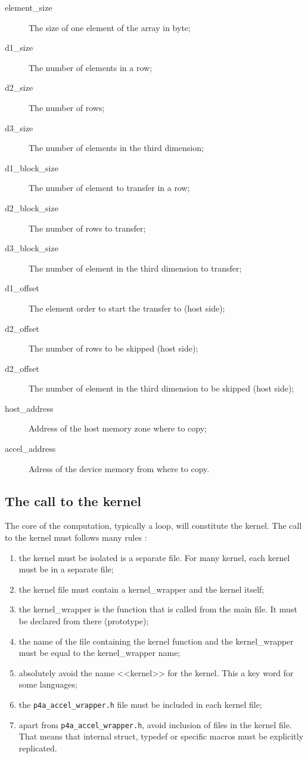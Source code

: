 \documentclass[a4paper]{article}
\begin{document}
\begin{description}
  \begin{description}
  \item[element\_size] The size of one element of the array in byte;
  \item[d1\_size] The number of elements in a row;
  \item[d2\_size] The number of rows;
  \item[d3\_size] The number of elements in the third dimension;
  \item[d1\_block\_size] The number of element to transfer in a row;
  \item[d2\_block\_size] The number of rows to transfer;
  \item[d3\_block\_size] The number of element in the third dimension
    to transfer;
  \item[d1\_offset] The element order to start the transfer to (host
    side);
  \item[d2\_offset] The number of rows to be skipped (host side);
  \item[d2\_offset] The number of element in the third dimension to be
    skipped (host side);
  \item[host\_address] Address of the host memory zone where to copy;
  \item[accel\_address] Adress of the device memory from where to copy.
  \end{description}

\end{description}

\subsection{The call to the kernel}

The core of the computation, typically a loop, will constitute the kernel.
The call to the kernel must follows many rules :

\begin{enumerate}
\item the kernel must be isolated is a separate file. For many kernel,
  each kernel must be in a separate file;
\item the kernel file must contain a kernel\_wrapper and the kernel itself;
\item the kernel\_wrapper is the function that is called from the main
  file. It must be declared from there (prototype);
\item the name of the file containing the kernel function and the
  kernel\_wrapper must be equal to the kernel\_wrapper name;
\item absolutely avoid the name <<kernel>> for the kernel. This a key
  word for some languages;
\item the \texttt{p4a\_accel\_wrapper.h} file must be included in each
  kernel file;
\item apart from \texttt{p4a\_accel\_wrapper.h}, avoid inclusion of files
  in the kernel file. That means that internal struct, typedef or
  specific macros must be explicitly replicated.
\end{enumerate}
\end{document}
